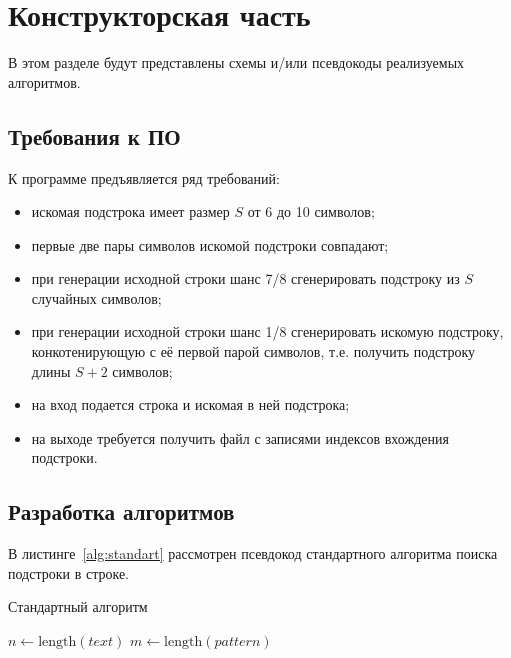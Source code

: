 \section{Конструкторская часть}

В этом разделе будут представлены схемы и/или псевдокоды реализуемых алгоритмов.

\subsection{Требования к ПО}
К программе предъявляется ряд требований:
\begin{itemize}[]
	\item искомая подстрока имеет размер $S$ от 6 до 10 символов;
	\item первые две пары символов искомой подстроки совпадают;
	\item при генерации исходной строки шанс 7/8 сгенерировать подстроку из $S$ случайных символов;
	\item при генерации исходной строки шанс 1/8 сгенерировать искомую подстроку, конкотенирующую с её первой парой символов, т.е. получить подстроку длины $S + 2$ символов;
	\item на вход подается строка и искомая в ней подстрока;
	\item на выходе требуется получить файл с записями индексов вхождения подстроки.
	
\end{itemize}

\newpage
\subsection{Разработка алгоритмов}

В листинге~\ref{alg:standart} рассмотрен псевдокод стандартного алгоритма поиска подстроки в строке.

\begin{algorithm}[H]
	\caption{Стандартный алгоритм}
	\label{alg:standart}
	\SetAlgoLined
	$n \gets \text{length}(text)$\;
	$m \gets \text{length}(pattern)$\;
	\;
\end{algorithm}

\newpage

